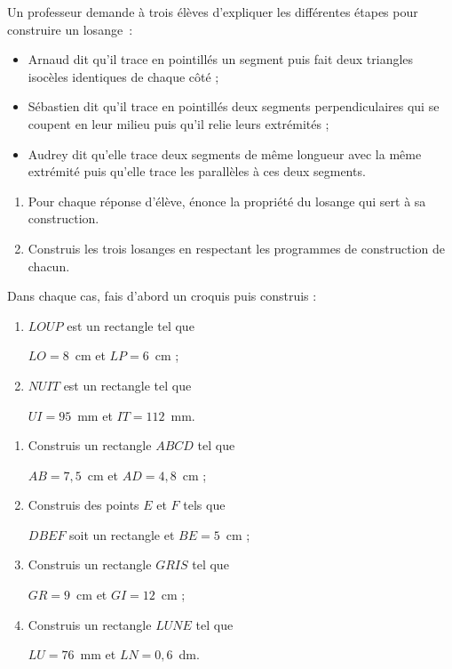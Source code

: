 \begin{exercice}
Un professeur demande à trois élèves d'expliquer les différentes étapes pour construire un losange : 
\begin{itemize}
 \item Arnaud dit qu'il trace en pointillés un segment puis fait deux triangles isocèles identiques de chaque côté ;
 \item Sébastien dit qu'il trace en pointillés deux segments perpendiculaires qui se coupent en leur milieu puis qu'il relie leurs extrémités ;
 \item Audrey dit qu'elle trace deux segments de même longueur avec la même extrémité puis qu'elle trace les parallèles à ces deux segments.
 \end{itemize}
 \begin{enumerate}
  \item Pour chaque réponse d'élève, énonce la propriété du losange qui sert à sa construction.
  \item Construis les trois losanges en respectant les programmes de construction de chacun.
 \end{enumerate}
\end{exercice}




\begin{exercice}
Dans chaque cas, fais d’abord un croquis puis construis :
\begin{enumerate}
 \item $LOUP$ est un rectangle tel que 
 
 $LO = 8$ cm et $LP = 6$ cm ;
 \item $NUIT$ est un rectangle tel que 
 
 $UI = 95$ mm et $IT = 112$ mm.
 \end{enumerate}
\end{exercice}
 
 
\begin{exercice}
\begin{enumerate}
 \item Construis un rectangle $ABCD$ tel que 
 
 $AB = 7,5$ cm et $AD = 4,8$ cm ;
 \item Construis des points $E$ et $F$ tels que 
 
 $DBEF$ soit un rectangle et $BE = 5$ cm ;
 \item Construis un rectangle $GRIS$ tel que 
 
 $GR = 9$ cm et $GI = 12$ cm ;
 \item Construis un rectangle $LUNE$ tel que 
 
 $LU = 76$ mm et $LN = 0,6$ dm.
 \end{enumerate} 
\end{exercice}

